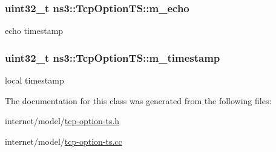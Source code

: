 \subsubsection[{\texorpdfstring{m\+\_\+echo}{m_echo}}]{\setlength{\rightskip}{0pt plus 5cm}uint32\+\_\+t ns3\+::\+Tcp\+Option\+T\+S\+::m\+\_\+echo\hspace{0.3cm}{\ttfamily [protected]}}\hypertarget{classns3_1_1TcpOptionTS_adafe4629ad7c27ef0f4f4fba344620c4}{}\label{classns3_1_1TcpOptionTS_adafe4629ad7c27ef0f4f4fba344620c4}


echo timestamp 

\subsubsection[{\texorpdfstring{m\+\_\+timestamp}{m_timestamp}}]{\setlength{\rightskip}{0pt plus 5cm}uint32\+\_\+t ns3\+::\+Tcp\+Option\+T\+S\+::m\+\_\+timestamp\hspace{0.3cm}{\ttfamily [protected]}}\hypertarget{classns3_1_1TcpOptionTS_a83d1b603d3254c11a6abcbebb2c01891}{}\label{classns3_1_1TcpOptionTS_a83d1b603d3254c11a6abcbebb2c01891}


local timestamp 



The documentation for this class was generated from the following files\+:\begin{DoxyCompactItemize}
\item 
internet/model/\hyperlink{tcp-option-ts_8h}{tcp-\/option-\/ts.\+h}\item 
internet/model/\hyperlink{tcp-option-ts_8cc}{tcp-\/option-\/ts.\+cc}\end{DoxyCompactItemize}
